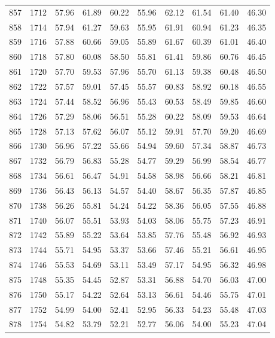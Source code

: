\begin{longtable}{rrllllllll}
		857 & 1712 & 57.96 & 61.89 & 60.22 & 55.96 & 62.12 & 61.54 & 61.40 & 46.30 \\ 
		858 & 1714 & 57.94 & 61.27 & 59.63 & 55.95 & 61.91 & 60.94 & 61.23 & 46.35 \\ 
		859 & 1716 & 57.88 & 60.66 & 59.05 & 55.89 & 61.67 & 60.39 & 61.01 & 46.40 \\ 
		860 & 1718 & 57.80 & 60.08 & 58.50 & 55.81 & 61.41 & 59.86 & 60.76 & 46.45 \\ 
		861 & 1720 & 57.70 & 59.53 & 57.96 & 55.70 & 61.13 & 59.38 & 60.48 & 46.50 \\ 
		862 & 1722 & 57.57 & 59.01 & 57.45 & 55.57 & 60.83 & 58.92 & 60.18 & 46.55 \\ 
		863 & 1724 & 57.44 & 58.52 & 56.96 & 55.43 & 60.53 & 58.49 & 59.85 & 46.60 \\ 
		864 & 1726 & 57.29 & 58.06 & 56.51 & 55.28 & 60.22 & 58.09 & 59.53 & 46.64 \\ 
		865 & 1728 & 57.13 & 57.62 & 56.07 & 55.12 & 59.91 & 57.70 & 59.20 & 46.69 \\ 
		866 & 1730 & 56.96 & 57.22 & 55.66 & 54.94 & 59.60 & 57.34 & 58.87 & 46.73 \\ 
		867 & 1732 & 56.79 & 56.83 & 55.28 & 54.77 & 59.29 & 56.99 & 58.54 & 46.77 \\ 
		868 & 1734 & 56.61 & 56.47 & 54.91 & 54.58 & 58.98 & 56.66 & 58.21 & 46.81 \\ 
		869 & 1736 & 56.43 & 56.13 & 54.57 & 54.40 & 58.67 & 56.35 & 57.87 & 46.85 \\ 
		870 & 1738 & 56.26 & 55.81 & 54.24 & 54.22 & 58.36 & 56.05 & 57.55 & 46.88 \\ 
		871 & 1740 & 56.07 & 55.51 & 53.93 & 54.03 & 58.06 & 55.75 & 57.23 & 46.91 \\ 
		872 & 1742 & 55.89 & 55.22 & 53.64 & 53.85 & 57.76 & 55.48 & 56.92 & 46.93 \\ 
		873 & 1744 & 55.71 & 54.95 & 53.37 & 53.66 & 57.46 & 55.21 & 56.61 & 46.95 \\ 
		874 & 1746 & 55.53 & 54.69 & 53.11 & 53.49 & 57.17 & 54.95 & 56.32 & 46.98 \\ 
		875 & 1748 & 55.35 & 54.45 & 52.87 & 53.31 & 56.88 & 54.70 & 56.03 & 47.00 \\ 
		876 & 1750 & 55.17 & 54.22 & 52.64 & 53.13 & 56.61 & 54.46 & 55.75 & 47.01 \\ 
		877 & 1752 & 54.99 & 54.00 & 52.41 & 52.95 & 56.33 & 54.23 & 55.48 & 47.03 \\ 
		878 & 1754 & 54.82 & 53.79 & 52.21 & 52.77 & 56.06 & 54.00 & 55.23 & 47.04 \\ 

\end{longtable}
